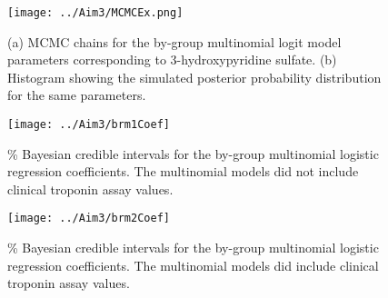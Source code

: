 \newpage
{}
\recalctypearea
\begin{figure}[H]
	\texttt{[image: ../Aim3/MCMCEx.png]}
	\caption[Time series plot of the MCMC chain for 3-hydroxypyridine sulfate multinomial logistic regression coefficient and resulting histogram showing the posterior distribution]{(a) MCMC chains for the by-group multinomial logit model parameters corresponding to 3-hydroxypyridine sulfate. (b) Histogram showing the simulated posterior probability distribution for the same parameters. \label{fig:brm1Coef} }
\end{figure}
\newpage
\begin{figure}[H]
	\texttt{[image: ../Aim3/brm1Coef]}
	\caption[Bayesian credible intervals for multinomial logit model parameters without troponin]{\% Bayesian credible intervals for the by-group multinomial logistic regression coefficients. The multinomial models did not include clinical troponin assay values. \label{fig:brm1Coef} }
\end{figure}
\newpage
\begin{figure}[H]
	\texttt{[image: ../Aim3/brm2Coef]}
	\caption[Bayesian credible intervals for multinomial logit model parameters with troponin]{\% Bayesian credible intervals for the by-group multinomial logistic regression coefficients. The multinomial models did include clinical troponin assay values. \label{fig:brm2Coef} }
\end{figure}
\newpage
{}
\recalctypearea

